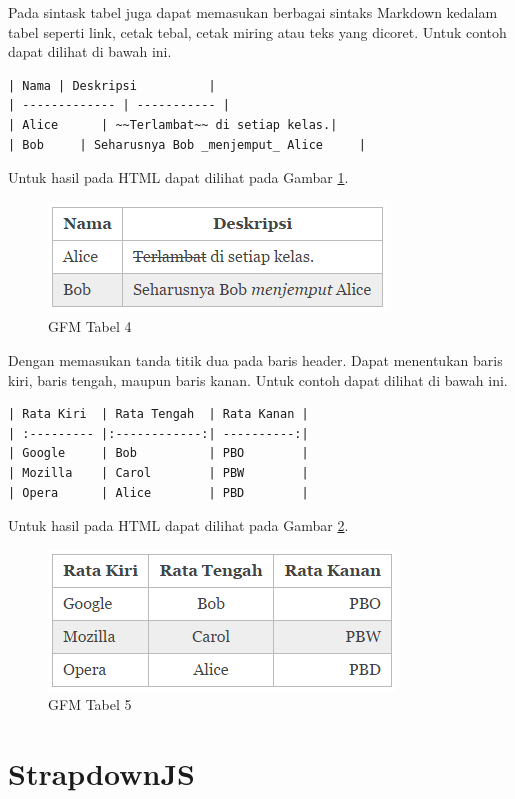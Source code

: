 \begin{itemize}
Pada sintask tabel juga dapat memasukan berbagai sintaks Markdown kedalam tabel seperti link, cetak tebal, cetak miring atau teks yang dicoret. Untuk contoh dapat dilihat di bawah ini.
\begin{lstlisting}[basicstyle=\footnotesize]
| Nama | Deskripsi          |
| ------------- | ----------- |
| Alice      | ~~Terlambat~~ di setiap kelas.|
| Bob     | Seharusnya Bob _menjemput_ Alice     |
\end{lstlisting}
Untuk hasil pada HTML dapat dilihat pada Gambar \ref{fig:t4}.
\begin{figure}[H]
\centering
\includegraphics[scale=1]{Gambar/t4.png}
\caption[GFM Tabel 4]{GFM Tabel 4}
\label{fig:t4}
\end{figure}

Dengan memasukan tanda titik dua pada baris header. Dapat menentukan baris kiri,
baris tengah, maupun baris kanan. Untuk contoh dapat dilihat di bawah ini.
\begin{lstlisting}[basicstyle=\footnotesize]
| Rata Kiri  | Rata Tengah  | Rata Kanan |
| :--------- |:------------:| ----------:|
| Google     | Bob          | PBO        |
| Mozilla    | Carol        | PBW        |
| Opera      | Alice        | PBD        |
\end{lstlisting}
Untuk hasil pada HTML dapat dilihat pada Gambar \ref{fig:t5}.
\begin{figure}[H]
\centering
\includegraphics[scale=1]{Gambar/t5.png}
\caption[GFM Tabel 5]{GFM Tabel 5}
\label{fig:t5}
\end{figure}
\end{itemize}

\section{StrapdownJS \cite{Strapdownjs:2014}}
\label{sec:stapdownjs}

